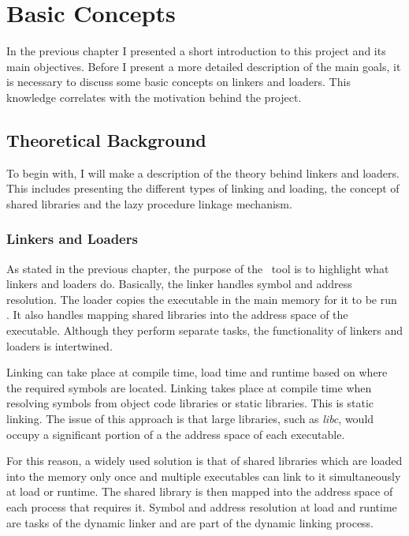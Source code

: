 \chapter{Basic Concepts}
\label{chapter:basic-concepts}

In the previous chapter I presented a short introduction to this project and its main objectives. Before I present a more detailed description of the main goals, it is necessary to discuss some basic concepts on linkers and loaders. This knowledge correlates with the motivation behind the project.

\section{Theoretical Background}
\label{sec:theor-background}

To begin with, I will make a description of the theory behind linkers and loaders. This includes presenting the different types of linking and loading, the concept of shared libraries and the lazy procedure linkage mechanism.  

\subsection{Linkers and Loaders}
\label{sub-sec:linkers-and-loaders}

As stated in the previous chapter, the purpose of the \project\ tool is to highlight what linkers and loaders do. Basically, the linker handles symbol and address resolution. The loader copies the executable in the main memory for it to be run \cite{linkers-and-loaders}. It also handles mapping shared libraries into the address space of the executable. Although they perform separate tasks, the functionality of linkers and loaders is intertwined.

Linking can take place at compile time, load time and runtime based on where the required symbols are located. Linking takes place at compile time when resolving symbols from object code libraries or static libraries. This is static linking. The issue of this approach is that large libraries, such as \textit{libc}, would occupy a significant portion of a the address space of each executable.

For this reason, a widely used solution is that of shared libraries which are loaded into the memory only once and multiple executables can link to it simultaneously at load or runtime. The shared library is then mapped into the address space of each process that requires it. Symbol and address resolution at load and runtime are tasks of the dynamic linker and are part of the dynamic linking process.

